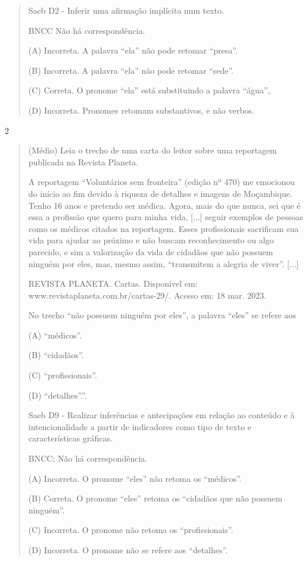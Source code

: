 \begin{itemize}
{{{\begin{itemize}
\begin{itemize}
\begin{itemize}
\begin{quote}
Saeb D2 - Inferir uma afirmação implícita num texto.

BNCC Não há correspondência.

(A) Incorreta. A palavra ``ela'' não pode retomar ``presa''.

(B) Incorreta. A palavra ``ela'' não pode retomar ``sede''.

(C) Correta. O pronome ``ela'' está substituindo a palavra ``água'',

(D) Incorreta. Pronomes retomam substantivos, e não verbos.
\end{quote}

\num{2}

\begin{quote}
(Médio) Leia o trecho de uma carta do leitor sobre uma reportagem
publicada na Revista Planeta.

A reportagem ``Voluntários sem fronteira'' (edição nº 470) me emocionou
do início ao fim devido à riqueza de detalhes e imagens de Moçambique.
Tenho 16 anos e pretendo ser médica. Agora, mais do que nunca, sei que é
essa a profissão que quero para minha vida, {[}...{]} seguir exemplos de
pessoas como os médicos citados na reportagem. Esses profissionais
sacrificam sua vida para ajudar ao próximo e não buscam reconhecimento
ou algo parecido, e sim a valorização da vida de cidadãos que não
possuem ninguém por eles, mas, mesmo assim, ``transmitem a alegria de
viver''. {[}...{]}

REVISTA PLANETA. Cartas. Disponível em:
www.revistaplaneta.com.br/cartas-29/. Acesso em: 18 mar. 2023.

No trecho ``não possuem ninguém por eles'', a palavra ``eles'' se refere
aos

(A) ``médicos''.

(B) ``cidadãos''.

(C) ``profissionais''.

(D) ``detalhes''.''.

Saeb D9 - Realizar inferências e antecipações em relação ao conteúdo e à
intencionalidade a partir de indicadores como tipo de texto e
características gráficas.

BNCC: Não há correspondência.

(A) Incorreta. O pronome ``eles'' não retoma os ``médicos''.

(B) Correta. O pronome ``eles'' retoma os ``cidadãos que não possuem
ninguém''.

(C) Incorreta. O pronome não retoma os ``profissionais''.

(D) Incorreta. O pronome não se refere aos ``detalhes''.
\end{quote}


\end{itemize}
\end{itemize}
\end{itemize}}}}
\end{itemize}

